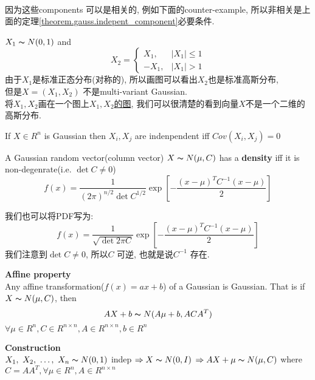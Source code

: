 \documentclass{article}
\begin{document}
\\
因为这些components 可以是相关的, 例如下面的counter-example, 所以非相关是上面的定理\ref{theorem.gauss.indepent_component}必要条件.
\begin{example}
$X_1 \thicksim{N}(0,1)$ and
$$
X_2 =
    \left\{
       \begin{array}{ll}
          X_1, & |X_1| \leq 1 \\
          - X_1, & |X_1| > 1
        \end{array}
    \right.
$$
由于$X_1$是标准正态分布(对称的), 所以画图可以看出$X_2$也是标准高斯分布,\\
但是$X=(X_1, X_2)$ 不是multi-variant Gaussian.\\
将$X_1, X_2$画在一个图上\href{http://i.imgbox.com/gmRq7VFK.png}{$X_1, X_2$的图}, 我们可以很清楚的看到向量$X$不是一个二维的高斯分布.
\end{example}

\begin{theorem}
If $X \in R^n$ is Gaussian then $X_i, X_j$ are indenpendent iff $Cov(X_i, X_j) = 0$
\end{theorem}

\begin{theorem}
A Gaussian random vector(column vector) $X \thicksim{N}(\mu, C)$ has a \textbf{density} iff it is non-degenrate(i.e. $\det{C} \neq 0$)
$$
f(x) = \frac{1}{(2\pi)^{n/2} \det{C}^{1/2}} \exp[- \frac{(x - \mu)^T C^{-1} (x - \mu)}{2}]
$$
\end{theorem}
我们也可以将PDF写为:
$$
f(x) = \frac{1}{\sqrt{\det{2 \pi C}}} \exp[- \frac{(x - \mu)^T C^{-1} (x - \mu)}{2}]
$$
我们注意到$\det{C} \neq 0$, 所以$C$ 可逆, 也就是说$C^{-1}$ 存在.

\begin{theorem}
\textbf{Affine property}\\
Any affine transformation($f(x) = ax + b$) of a Gaussian is Gaussian. That is if $X \thicksim{N}(\mu, C)$, then
$$AX+b \thicksim{N}(A\mu + b, ACA^T)$$
$\forall \mu \in R^n, C \in R^{n \times n}, A \in R^{n \times n}, b \in R^n$
\end{theorem}

\begin{fact}
\textbf{Construction}\\
$X_1,~X_2,~\ldots,~X_n \thicksim{N}(0,1)$ indep $\Rightarrow X \thicksim{N}(0, I)$
$\Rightarrow AX + \mu \thicksim{N}(\mu, C)$ where $C = A A^T, \forall \mu \in R^n, A \in R^{n \times n}$
\end{fact}
\end{document}
